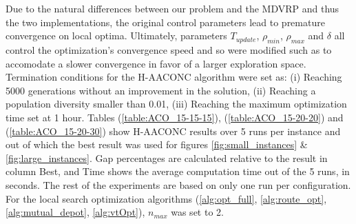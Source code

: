 \documentclass{article}
\begin{document}
	Due to the natural differences between our problem and the MDVRP and thus the two implementations, the original control parameters lead to premature convergence on local optima. Ultimately, parameters $T_{update}$, $\rho_{min}$, $\rho_{max}$ and $\delta$ all control the optimization's convergence speed and so were modified such as to accomodate a slower convergence in favor of a larger exploration space. Termination conditions for the H-AACONC algorithm were set as: (i) Reaching 5000 generations without an improvement in the solution, (ii) Reaching a population diversity smaller than 0.01, (iii) Reaching the maximum optimization time set at 1 hour. Tables (\ref{table:ACO_15-15-15}), (\ref{table:ACO_15-20-20}) and (\ref{table:ACO_15-20-30}) show H-AACONC results over 5 runs per instance and out of which the best result was used for figures \ref{fig:small_instances} \& \ref{fig:large_instances}. Gap percentages are calculated relative to the result in column Best, and Time shows the average computation time out of the 5 runs, in seconds. The rest of the experiments are based on only one run per configuration.
	For the local search optimization algorithms (\ref{alg:opt_full}, \ref{alg:route_opt}, \ref{alg:mutual_depot}, \ref{alg:vtOpt}), $n_{max}$ was set to 2.
	\par
\end{document}
